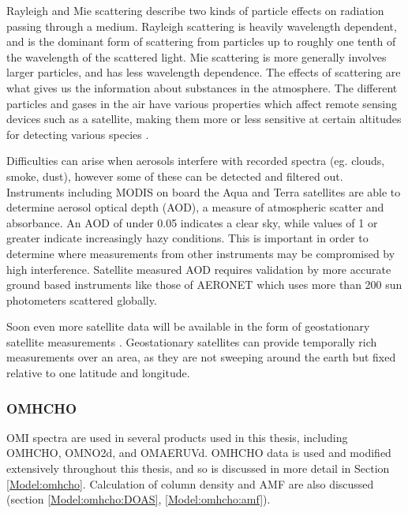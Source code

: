     
    Rayleigh and Mie scattering describe two kinds of particle effects on radiation passing through a medium.
    Rayleigh scattering is heavily wavelength dependent, and is the dominant form of scattering from particles up to roughly one tenth of the wavelength of the scattered light.
    Mie scattering is more generally involves larger particles, and has less wavelength dependence.
    The effects of scattering are what gives us the information about substances in the atmosphere.
    The different particles and gases in the air have various properties which affect remote sensing devices such as a satellite, making them more or less sensitive at certain altitudes for detecting various species \parencite[e.g.][]{Martin2002}.
    
    Difficulties can arise when aerosols interfere with recorded spectra (eg. clouds, smoke, dust), however some of these can be detected and filtered out.
    Instruments including MODIS on board the Aqua and Terra satellites are able to determine aerosol optical depth (AOD), a measure of atmospheric scatter and absorbance. 
    An AOD of under 0.05 indicates a clear sky, while values of 1 or greater indicate increasingly hazy conditions.
    This is important in order to determine where measurements from other instruments may be compromised by high interference.
    Satellite measured AOD requires validation by more accurate ground based instruments like those of AERONET which uses more than 200 sun photometers scattered globally.
    
    Soon even more satellite data will be available in the form of geostationary satellite measurements \parencite{Kwon2017}.
    Geostationary satellites can provide temporally rich measurements over an area, as they are not sweeping around the earth but fixed relative to one latitude and longitude.
    
    \subsubsection{OMHCHO}
      
      OMI spectra are used in several products used in this thesis, including OMHCHO, OMNO2d, and OMAERUVd.
      OMHCHO data is used and modified extensively throughout this thesis, and so is discussed in more detail in Section \ref{Model:omhcho}.
      Calculation of column density and AMF are also discussed (section \ref{Model:omhcho:DOAS}, \ref{Model:omhcho:amf}).
  
